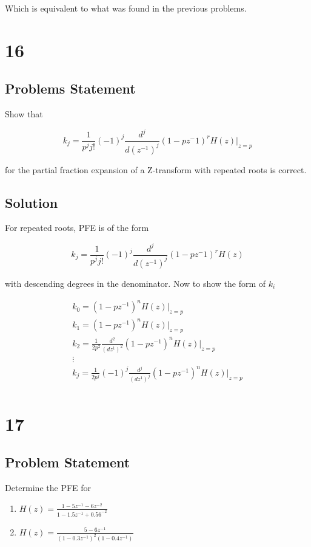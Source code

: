 \documentclass[11pt,a4paper,final]{article}
\begin{document}
Which is equivalent to what was found in the previous problems.

\section{16}
\label{sec:org0d7038e}
\subsection{Problems Statement}
\label{sec:orgd14a44a}
Show that

$$
k_j = \frac{1}{p^j j!}(-1)^j \frac{d^j}{d(z^{-1})^j} (1-pz^-1)^r H(z) \Big|_{z=p}
$$

for the partial fraction expansion of a Z-transform with repeated roots is correct.

\subsection{Solution}
\label{sec:org7fc9e76}
For repeated roots, PFE is of the form

$$
k_j = \frac{1}{p^j j!}(-1)^j \frac{d^j}{d(z^{-1})^j} (1-pz^-1)^r H(z)
$$

with descending degrees in the denominator. Now to show the form of \(k_i\)

\begin{equation*}
\begin{array}{c}
k_0 = (1-pz^{-1})^n H(z) |_{z=p} \\
k_1 = (1-pz^{-1})^n H(z) |_{z=p} \\
k_2 = \frac{1}{2p^2}\frac{d^2}{(dz^{1})^2}(1-pz^{-1})^n H(z) |_{z=p} \\
\vdots \\
k_j = \frac{1}{2p^j}(-1)^j\frac{d^j}{(dz^{1})^j}(1-pz^{-1})^n H(z) |_{z=p} \\
\end{array}
\end{equation*}

\section{17}
\label{sec:orga9cf00d}
\subsection{Problem Statement}
\label{sec:orgabe9382}
Determine the PFE for

\begin{enumerate}
\item \(H(z) = \frac{1-5z^{-1}-6z^{-2}}{1-1.5z^{-1}+0.56^{-2}}\)
\item \(H(z) = \frac{5-6z^{-1}}{(1-0.3z^{-1})^2(1-0.4z^{-1})}\)
\end{enumerate}
\end{document}
